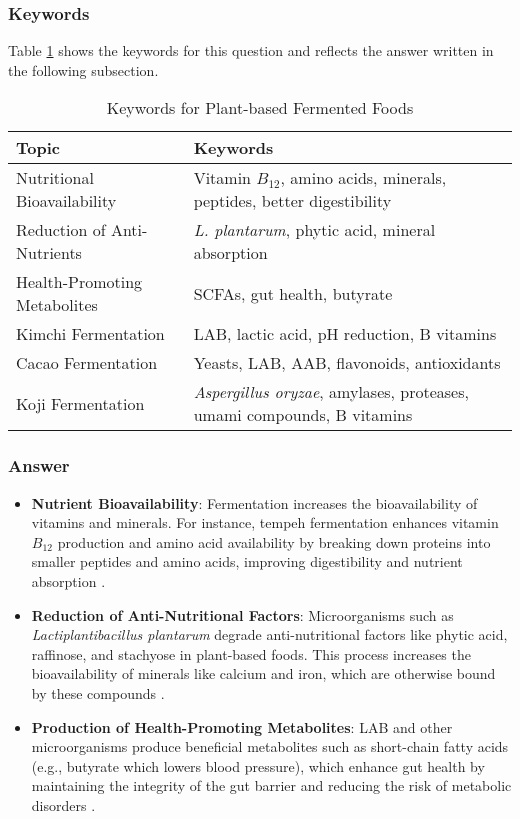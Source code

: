 \subsubsection*{Keywords}
Table \ref{tab:KW-PlantFermented} shows the keywords for this question and reflects the answer written in the following subsection.
\begin{table}[h]
    \centering
    \caption{Keywords for Plant-based Fermented Foods} 
    \label{tab:KW-PlantFermented}
    \begin{tabularx}{\textwidth}{l|X}
        \textbf{Topic} & \textbf{Keywords} \\
        \hline
        Nutritional Bioavailability & Vitamin $B_{12}$, amino acids, minerals, peptides, better digestibility \\

        Reduction of Anti-Nutrients & \textit{L. plantarum}, phytic acid, mineral absorption \\

        Health-Promoting Metabolites & SCFAs, gut health, butyrate \\

        Kimchi Fermentation & LAB, lactic acid, pH reduction, B vitamins \\

        Cacao Fermentation & Yeasts, LAB, AAB, flavonoids, antioxidants \\

        Koji Fermentation & \textit{Aspergillus oryzae}, amylases, proteases, umami compounds, B vitamins \\
    \end{tabularx}
\end{table}


\subsubsection*{Answer}
\begin{itemize}
    \item \textbf{Nutrient Bioavailability}: Fermentation increases the bioavailability of vitamins and minerals. For instance, tempeh fermentation enhances vitamin $B_{12}$ production and amino acid availability by breaking down proteins into smaller peptides and amino acids, improving digestibility and nutrient absorption \cite*{LS22}.
    \item \textbf{Reduction of Anti-Nutritional Factors}: Microorganisms such as \textit{Lactiplantibacillus plantarum} degrade anti-nutritional factors like phytic acid, raffinose, and stachyose in plant-based foods. This process increases the bioavailability of minerals like calcium and iron, which are otherwise bound by these compounds \cite*{LS22}.
    \item \textbf{Production of Health-Promoting Metabolites}: LAB and other microorganisms produce beneficial metabolites such as short-chain fatty acids (e.g., butyrate which lowers blood pressure), which enhance gut health by maintaining the integrity of the gut barrier and reducing the risk of metabolic disorders \cite*{LS22,LS19}.
\end{itemize}

